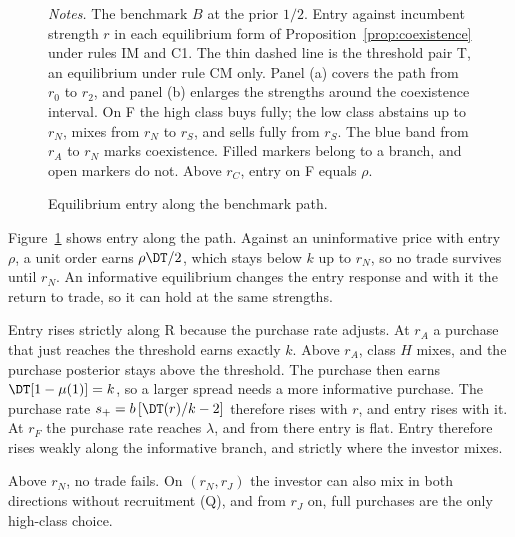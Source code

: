 \begin{figure}[tbp]
\centering
{}
\caption{Equilibrium entry along the benchmark path.}\label{fig:coexistence}
\par\medskip
\begin{minipage}{\linewidth}\footnotesize\singlespacing
\textit{Notes.} The benchmark \(B\) at the prior \(1/2\). Entry against incumbent strength \(r\) in each equilibrium
form of Proposition~\ref{prop:coexistence} under rules IM and C1. The thin dashed line is the threshold pair T, an
equilibrium under rule CM only. Panel (a) covers the path from \(r_0\) to \(r_2\), and panel (b) enlarges the
strengths around the coexistence interval. On F the high class buys fully; the low class abstains up to \(r_N\),
mixes from \(r_N\) to \(r_S\), and sells fully from \(r_S\). The blue band from \(r_A\) to \(r_N\) marks
coexistence. Filled markers belong to a branch, and open markers do not. Above \(r_C\), entry on F equals \(\rho\).
\end{minipage}
\end{figure}

Figure~\ref{fig:coexistence} shows entry along the path. Against an uninformative price with entry \(\rho\), a
unit order earns \(\rho\DT/2\), which stays below \(k\) up to \(r_N\), so no trade survives until \(r_N\). An
informative equilibrium changes the entry response and with it the return to trade, so it can hold at the same
strengths.

Entry rises strictly along R because the purchase rate adjusts. At \(r_A\) a purchase that just reaches the
threshold earns exactly \(k\). Above \(r_A\), class \(H\) mixes, and the purchase posterior stays above the
threshold. The purchase then earns \(\DT[1-\mu(1)]=k\), so a larger spread needs a more informative purchase. The
purchase rate \(s_+=b\,[\DT(r)/k-2]\) therefore rises with \(r\), and entry rises with it. At \(r_F\) the purchase
rate reaches \(\lambda\), and from there entry is flat. Entry therefore rises weakly along the informative branch,
and strictly where the investor mixes.

Above \(r_N\), no trade fails. On \((r_N,r_J)\) the investor can also mix in both directions without recruitment
(Q), and from \(r_J\) on, full purchases are the only high-class choice.

